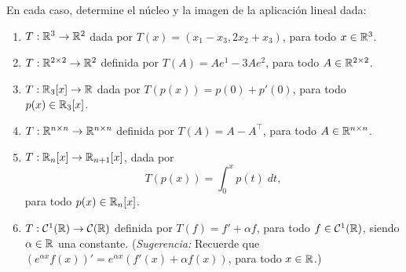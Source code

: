 \documentclass[a4,11pt]{aleph-notas}
\begin{document}
\encabezado

\begin{ejer}
    En cada caso, determine el núcleo y la imagen de la aplicación lineal dada:
    \begin{enumerate}
        \item $T:\mathbb{R}^3\to\mathbb{R}^2$ dada por $T(x) = (x_1-x_3,2x_2+x_3)$, para todo $x\in\mathbb{R}^3$.
        \item $T:\mathbb{R}^{2\times 2} \to \mathbb{R}^2$ definida por $T(A)=Ae^{1} - 3Ae^2$, para todo $A\in\mathbb{R}^{2\times 2}$.
        \item $T:\mathbb{R}_3[x]\to \mathbb{R}$ dada por $T(p(x))=p(0) + p'(0)$, para todo $p(x)\in\mathbb{R}_3[x]$.
        \item $T:\mathbb{R}^{n\times n}\to \mathbb{R}^{n\times n}$ definida por $T(A)=A-A^\intercal$, para todo $A\in\mathbb{R}^{n\times n}$.
        \item $T:\mathbb{R}_n[x]\to \mathbb{R}_{n+1}[x]$, dada por
        \[
            T(p(x)) = \int_0^x p(t)\; dt,
        \]
        para todo $p(x)\in \mathbb{R}_n[x]$.
        \item $T:\mathcal{C}^1(\mathbb{R})\to\mathcal{C}(\mathbb{R})$ definida por $T(f)=f' + \alpha f$, para todo $f\in\mathcal{C}^1(\mathbb{R})$, siendo $\alpha\in \mathbb{R}$ una constante. (\emph{Sugerencia:} Recuerde que $(e^{\alpha x}f(x))' = e^{\alpha x}(f'(x) + \alpha f(x))$, para todo $x\in\mathbb{R}$.)
    \end{enumerate}
\end{ejer}
\end{document}
